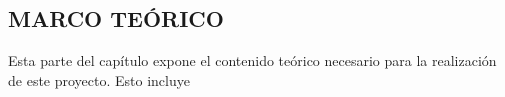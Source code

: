 
\subsection{MARCO TEÓRICO}

Esta parte del capítulo expone el contenido teórico necesario para la realización de este proyecto. Esto incluye 